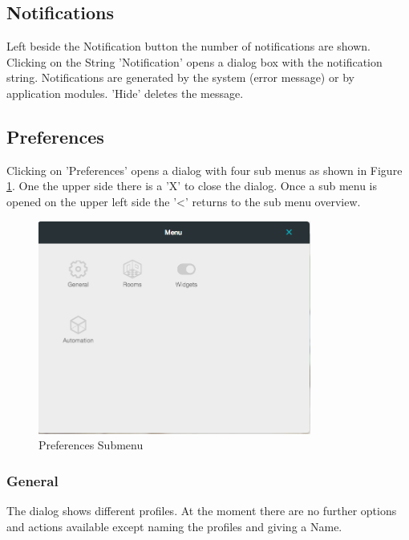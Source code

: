 \subsection{Notifications}

Left beside the Notification button the number of notifications are shown. Clicking on 
the String 'Notification' opens a dialog box with the notification string. Notifications
are generated by the system (error message) or by application modules.
'Hide' deletes the message.

\subsection{Preferences}

Clicking on 'Preferences' opens a dialog with four sub menus as shown in Figure 
\ref{ha_prefs}. One the upper 
side there is a 'X' to close the dialog. Once a sub menu is opened on the 
upper left side the '<' returns to the sub menu overview.

\begin{figure} 
\begin{center}
\includegraphics[width=0.8\textwidth]{pics/ha_preferences.png}
\caption{Preferences Submenu}
\label{ha_prefs}
\end{center} 
\end{figure}


\subsubsection{General}

The dialog shows different profiles. At the moment there are no further options 
and actions available except naming the profiles and giving a Name.

